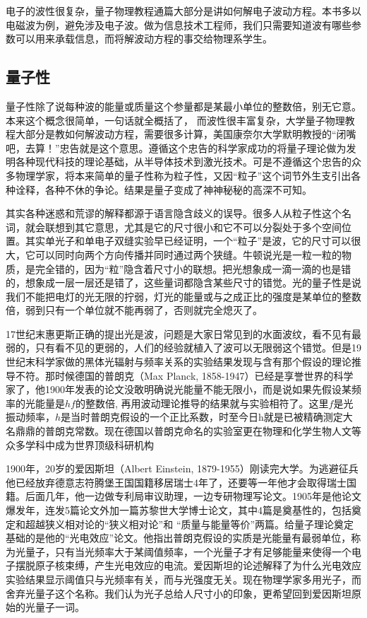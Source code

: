 \documentclass{ctexbook}
\begin{document}
电子的波性很复杂，量子物理教程通篇大部分是讲如何解电子波动方程。本书多以电磁波为例，避免涉及电子波。做为信息技术工程师，我们只需要知道波有哪些参数可以用来承载信息，而将解波动方程的事交给物理系学生。

\subsection{量子性}
量子性除了说每种波的能量或质量这个参量都是某最小单位的整数倍，别无它意。本来这个概念很简单，一句话就全概括了， 而波性很丰富复杂，大学量子物理教程大部分是教如何解波动方程，需要很多计算，美国康奈尔大学默明教授的“闭嘴吧，去算！”忠告就是这个意思。遵循这个忠告的科学家成功的将量子理论做为发明各种现代科技的理论基础，从半导体技术到激光技术。可是不遵循这个忠告的众多物理学家，将本来简单的量子性称为粒子性，又因“粒子”这个词节外生支引出各种诠释，各种不休的争论。结果是量子变成了神神秘秘的高深不可知。

其实各种迷惑和荒谬的解释都源于语言隐含歧义的误导。很多人从粒子性这个名词，就会联想到其它意思，尤其是它的尺寸很小和它不可以分裂处于多个空间位置。其实单光子和单电子双缝实验早已经证明，一个“粒子”是波，它的尺寸可以很大，它可以同时向两个方向传播并同时通过两个狭缝。牛顿说光是一粒一粒的物质，是完全错的，因为“粒”隐含着尺寸小的联想。把光想象成一滴一滴的也是错的，想象成一层一层还是错了，这些量词都隐含某些尺寸的错觉。光的量子性是说我们不能把电灯的光无限的拧弱，灯光的能量或与之成正比的强度是某单位的整数倍，弱到只有一个单位就不能再弱了，否则就完全熄灭了。

17世纪末惠更斯正确的提出光是波，问题是大家日常见到的水面波纹，看不见有最弱的，只有看不见的更弱的，人们的经验就植入了波可以无限弱这个错觉。但是19世纪末科学家做的黑体光辐射与频率关系的实验结果发现与含有那个假设的理论推导不符。那时候德国的普朗克（Max Planck, 1858-1947）已经是享誉世界的科学家了，他1900年发表的论文没敢明确说光能量不能无限小，而是说如果先假设某频率的光能量是$hf$的整数倍, 再用波动理论推导的结果就与实验相符了。这里$f$是光振动频率，$h$是当时普朗克假设的一个正比系数，时至今日h就是已被精确测定大名鼎鼎的普朗克常数。现在德国以普朗克命名的实验室更在物理和化学生物人文等众多学科中成为世界顶级科研机构

1900年，20岁的爱因斯坦（Albert Einstein, 1879-1955）刚读完大学。为逃避征兵他已经放弃德意志符腾堡王国国籍移居瑞士4年了，还要等一年他才会取得瑞士国籍。后面几年，他一边做专利局审议助理，一边专研物理写论文。1905年是他论文爆发年，连发5篇论文外加一篇苏黎世大学博士论文，其中4篇是奠基性的，包括奠定和超越狭义相对论的“狭义相对论”和 “质量与能量等价”两篇。给量子理论奠定基础的是他的“光电效应”论文。他指出普朗克假设的实质是光能量有最弱单位，称为光量子，只有当光频率大于某阈值频率，一个光量子才有足够能量来使得一个电子摆脱原子核束缚，产生光电效应的电流。爱因斯坦的论述解释了为什么光电效应实验结果显示阈值只与光频率有关，而与光强度无关。现在物理学家多用光子，而舍弃光量子这个名称。我们认为光子总给人尺寸小的印象，更希望回到爱因斯坦原始的光量子一词。
\end{document}
